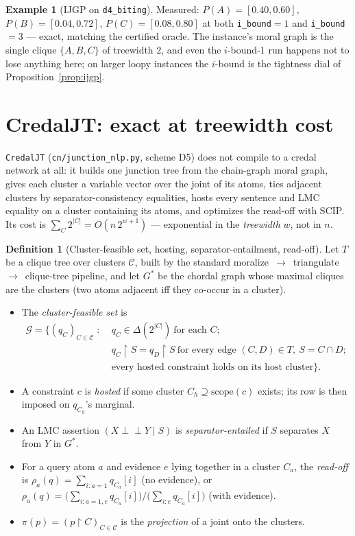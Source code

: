 \documentclass[11pt]{article}
\theoremstyle{definition}
\newtheorem{definition}{Definition}
\newtheorem{example}{Example}
\newcommand{\indep}{\perp\!\!\!\perp}
\newcommand{\restr}{\!\restriction\!}
\newcommand{\readoff}{\rho}
\begin{document}
\begin{example}[IJGP on \texttt{d4\_biting}]\label{ex:ijgp}
Measured: $P(A)=[0.40,0.60]$, $P(B)=[0.04,0.72]$, $P(C)=[0.08,0.80]$ at both \texttt{i\_bound}$=1$
and \texttt{i\_bound}$=3$ --- exact, matching the certified oracle. The instance's moral graph is the
single clique $\{A,B,C\}$ of treewidth $2$, and even the $i$-bound-$1$ run happens not to lose
anything here; on larger loopy instances the $i$-bound is the tightness dial of
Proposition~\ref{prop:ijgp}.
\end{example}

\section{CredalJT: exact at treewidth cost}\label{sec:d5}

\texttt{CredalJT} (\texttt{cn/junction\_nlp.py}, scheme D5) does not compile to a credal network at
all: it builds one junction tree from the chain-graph moral graph, gives each cluster a variable
vector over the joint of its atoms, ties adjacent clusters by separator-consistency equalities, hosts
every sentence and LMC equality on a cluster containing its atoms, and optimizes the read-off with
SCIP. Its cost is $\sum_C 2^{|C|}=O(n\,2^{w+1})$ --- exponential in the \emph{treewidth} $w$, not in
$n$.

\begin{definition}[Cluster-feasible set, hosting, separator-entailment, read-off]\label{def:d5}
Let $T$ be a clique tree over clusters $\mathcal C$, built by the standard
moralize~$\to$~triangulate~$\to$~clique-tree pipeline, and let $G^\ast$ be the chordal graph whose
maximal cliques are the clusters (two atoms adjacent iff they co-occur in a cluster).
\begin{itemize}
  \item The \emph{cluster-feasible set} is
  \begin{align*}
    \mathcal G=\bigl\{(q_C)_{C\in\mathcal C}\;:\;
      &q_C\in\Delta(2^{|C|})\ \text{for each }C;\\
      &q_C\restr S=q_D\restr S\ \text{for every edge }(C,D)\in T,\ S=C\cap D;\\
      &\text{every hosted constraint holds on its host cluster}\bigr\}.
  \end{align*}
  \item A constraint $c$ is \emph{hosted} if some cluster $C_h\supseteq\mathrm{scope}(c)$ exists; its
    row is then imposed on $q_{C_h}$'s marginal.
  \item An LMC assertion $(X\indep Y\mid S)$ is \emph{separator-entailed} if $S$ separates $X$ from
    $Y$ in $G^\ast$.
  \item For a query atom $a$ and evidence $e$ lying together in a cluster $C_a$, the \emph{read-off}
    is
    $\readoff_a(q)=\sum_{i:a=1}q_{C_a}[i]$ (no evidence), or
    $\readoff_a(q)=\bigl(\sum_{i:a=1,e}q_{C_a}[i]\bigr)/\bigl(\sum_{i:e}q_{C_a}[i]\bigr)$ (with
    evidence).
  \item $\pi(p)=(p\restr C)_{C\in\mathcal C}$ is the \emph{projection} of a joint onto the clusters.
\end{itemize}
\end{definition}
\end{document}
